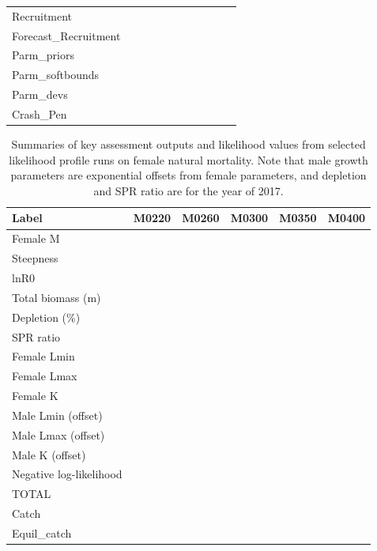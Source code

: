 \documentclass[12pt,]{article}
\begin{document}
\begin{landscape}
\begin{table}[ht]
\begin{tabular}{l|ccccc|ccccc}
  Recruitment &  &  &  &  &  &  &  &  &  &  \\ 
  Forecast\_Recruitment &  &  &  &  &  &  &  &  &  &  \\ 
  Parm\_priors &  &  &  &  &  &  &  &  &  &  \\ 
  Parm\_softbounds &  &  &  &  &  &  &  &  &  &  \\ 
  Parm\_devs &  &  &  &  &  &  &  &  &  &  \\ 
  Crash\_Pen &  &  &  &  &  &  &  &  &  &  \\ 
   \hline
\end{tabular}
\end{table}
\begin{table}[ht]
\centering
\caption{Summaries of key assessment outputs 
                                              and likelihood values from selected 
                                              likelihood profile runs on female 
                                              natural mortality.  Note that male 
                                              growth parameters are exponential 
                                              offsets from female parameters, and 
                                              depletion and SPR ratio are for the year of 2017.} 
\label{tab:like_profiles}
\begin{tabular}{l|ccccc}
  \hline
Label & M0220 & M0260 & M0300 & M0350 & M0400 \\ 
  \hline
Female M &  &  &  &  &  \\ 
  Steepness &  &  &  &  &  \\ 
  lnR0 &  &  &  &  &  \\ 
  Total biomass (m) &  &  &  &  &  \\ 
  Depletion (\%) &  &  &  &  &  \\ 
  SPR ratio &  &  &  &  &  \\ 
  Female Lmin &  &  &  &  &  \\ 
  Female Lmax &  &  &  &  &  \\ 
  Female K &  &  &  &  &  \\ 
  Male Lmin (offset) &  &  &  &  &  \\ 
  Male Lmax (offset) &  &  &  &  &  \\ 
  Male K (offset) &  &  &  &  &  \\ 
  Negative log-likelihood &  &  &  &  &  \\ 
  TOTAL &  &  &  &  &  \\ 
  Catch &  &  &  &  &  \\ 
  Equil\_catch &  &  &  &  &  \\ 

\end{tabular}
\end{table}
\end{landscape}
\end{document}
